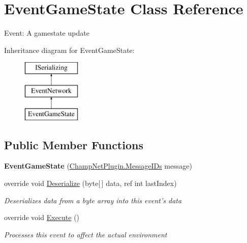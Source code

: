 \hypertarget{class_event_game_state}{\section{Event\-Game\-State Class Reference}
\label{class_event_game_state}
}


Event\-: A gamestate update  


Inheritance diagram for Event\-Game\-State\-:\begin{figure}[H]
\begin{center}
\leavevmode
\includegraphics[height=3.000000cm]{class_event_game_state}
\end{center}
\end{figure}
\subsection*{Public Member Functions}
\begin{DoxyCompactItemize}
\item 
\hypertarget{class_event_game_state_a34fd6692a15dabe770011dfe4d65057c}{{\bfseries Event\-Game\-State} (\hyperlink{namespace_champ_net_plugin_a2ade5cfa7cf6c25ab7236c6b54a57821}{Champ\-Net\-Plugin.\-Message\-I\-Ds} message)}\label{class_event_game_state_a34fd6692a15dabe770011dfe4d65057c}

\item 
override void \hyperlink{class_event_game_state_ac8d792c7dea5e0d703d317a66bcd4cdf}{Deserialize} (byte\mbox{[}$\,$\mbox{]} data, ref int last\-Index)
\begin{DoxyCompactList}\small\item\em Deserializes data from a byte array into this event's data \end{DoxyCompactList}\item 
override void \hyperlink{class_event_game_state_a9cf710bdb22c50a1e3af2615508861b6}{Execute} ()
\begin{DoxyCompactList}\small\item\em Processes this event to affect the actual environment \end{DoxyCompactList}\end{DoxyCompactItemize}
